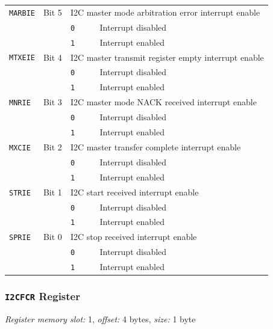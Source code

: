 \begin{tabularx}{\textwidth}{ l l l X }
\hline
\texttt{MARBIE} & Bit 5 & \multicolumn{2}{X}{I2C master mode arbitration error interrupt enable} \\
 & & \texttt{0} & Interrupt disabled \\
 & & \cellcolor{tablehighlightcolor}\texttt{1} & \cellcolor{tablehighlightcolor}Interrupt enabled \\
\hline
\texttt{MTXEIE} & Bit 4 & \multicolumn{2}{X}{I2C master transmit register empty interrupt enable} \\
 & & \texttt{0} & Interrupt disabled \\
 & & \cellcolor{tablehighlightcolor}\texttt{1} & \cellcolor{tablehighlightcolor}Interrupt enabled \\
\hline
\texttt{MNRIE} & Bit 3 & \multicolumn{2}{X}{I2C master mode NACK received interrupt enable} \\
 & & \texttt{0} & Interrupt disabled \\
 & & \cellcolor{tablehighlightcolor}\texttt{1} & \cellcolor{tablehighlightcolor}Interrupt enabled \\
\hline
\texttt{MXCIE} & Bit 2 & \multicolumn{2}{X}{I2C master transfer complete interrupt enable} \\
 & & \texttt{0} & Interrupt disabled \\
 & & \cellcolor{tablehighlightcolor}\texttt{1} & \cellcolor{tablehighlightcolor}Interrupt enabled \\
\hline
\texttt{STRIE} & Bit 1 & \multicolumn{2}{X}{I2C start received interrupt enable} \\
 & & \texttt{0} & Interrupt disabled \\
 & & \cellcolor{tablehighlightcolor}\texttt{1} & \cellcolor{tablehighlightcolor}Interrupt enabled \\
\hline
\texttt{SPRIE} & Bit 0 & \multicolumn{2}{X}{I2C stop received interrupt enable} \\
 & & \texttt{0} & Interrupt disabled \\
 & & \cellcolor{tablehighlightcolor}\texttt{1} & \cellcolor{tablehighlightcolor}Interrupt enabled \\
\hline
\end{tabularx}

\subsubsection{\texttt{I2CFCR} Register} \label{ss:I2CxFCR}
\noindent \textit{Register memory slot:} 1, \textit{offset:} 4 bytes, \textit{size:} 1 byte

